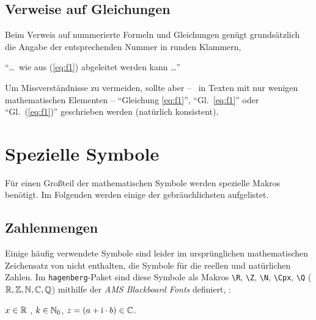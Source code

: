 \subsection{Verweise auf Gleichungen}
\label{sec:VerweiseAufGleichungen}

Beim Verweis auf nummerierte Formeln und Gleichungen genügt grundsätzlich die Angabe 
der entsprechenden Nummer in runden Klammern,
\zB\
\begin{center}
"`\ldots\ wie aus (\ref{eq:f1}) abgeleitet werden kann \ldots"'
\end{center}
Um Missverständnisse zu vermeiden, sollte aber -- \va\ in Texten mit
nur wenigen mathematischen Elementen -- "`Gleichung \ref{eq:f1}"', "`Gl.~\ref{eq:f1}"' 
oder "`Gl.~(\ref{eq:f1})"' geschrieben werden (natürlich konsistent). 

\begin{center}
\setlength{\fboxrule}{0.2mm}
\setlength{\fboxsep}{2mm}
\end{center}


\section{Spezielle Symbole}

Für einen Großteil der mathematischen Symbole werden spezielle Makros benötigt. Im Folgenden werden einige der gebräuchlichsten aufgelistet.

\subsection{Zahlenmengen}
Einige häufig verwendete Symbole sind leider im ursprünglichen
mathematischen Zeichensatz von \latex nicht enthalten, \zB die
Symbole für die reellen und natürlichen Zahlen. Im \texttt{hagenberg}-Paket sind diese Symbole als Makros 
\verb!\R!, \verb!\Z!, \verb!\N!, \verb!\Cpx!, \verb!\Q!
($\R, \Z, \N, \Cpx, \Q$)
mithilfe der \emph{AMS Blackboard Fonts} definiert, \zB:
\begin{center}
$x \in \R$ , $k \in \N_0$, $z = (a + \mathrm{i} \cdot b) \in \Cpx$.
\end{center}



